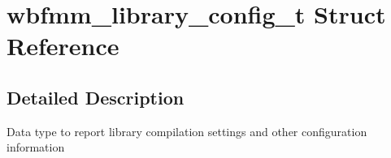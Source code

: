 \section{wbfmm\+\_\+library\+\_\+config\+\_\+t Struct Reference}
\label{structwbfmm__library__config__t}


\subsection{Detailed Description}
Data type to report library compilation settings and other configuration information 